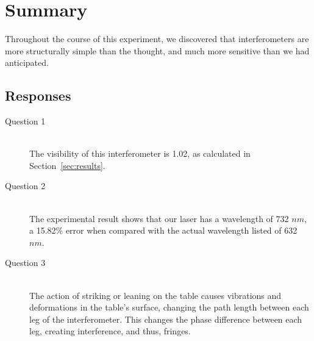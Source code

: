 \section{Summary}

Throughout the course of this experiment, we discovered that interferometers are
more structurally simple than the thought, and much more sensitive than we had
anticipated.   


\subsection{Responses}
\begin{description}
    \item[Question 1] \hfill \\
        The visibility of this interferometer is 1.02, as calculated in
        Section~\ref{sec:results}.
    \item[Question 2] \hfill \\
        The experimental result shows that our laser has a wavelength of 732
        $nm$, a 15.82\% error when compared with the actual wavelength listed of
        632 $nm$.
    \item[Question 3] \hfill \\
        The action of striking or leaning on the table causes vibrations and
        deformations in the table's surface, changing the path length between
        each leg of the interferometer. This changes the phase difference
        between each leg, creating interference, and thus, fringes.
\end{description}
